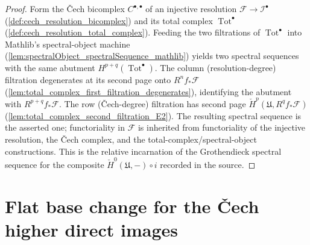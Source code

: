 \begin{proof}
  Form the {\v C}ech bicomplex \(C^{\bullet,\bullet}\) of an injective resolution
  \(\mathcal{F} \to \mathcal{I}^\bullet\) (\cref{def:cech_resolution_bicomplex}) and its
  total complex \(\operatorname{Tot}^\bullet\) (\cref{def:cech_resolution_total_complex}).
  Feeding the two filtrations of \(\operatorname{Tot}^\bullet\) into Mathlib's
  spectral-object machine (\cref{lem:spectralObject_spectralSequence_mathlib}) yields
  two spectral sequences with the same abutment
  \(H^{p+q}(\operatorname{Tot}^\bullet)\). The column (resolution-degree) filtration
  degenerates at its second page onto \(R^n f_*\mathcal{F}\)
  (\cref{lem:total_complex_first_filtration_degenerates}), identifying the abutment with
  \(R^{p+q} f_*\mathcal{F}\). The row ({\v C}ech-degree) filtration has second page
  \(\check{H}^p(\mathfrak{U}, R^q f_*\mathcal{F})\)
  (\cref{lem:total_complex_second_filtration_E2}). The resulting spectral sequence is
  the asserted one; functoriality in \(\mathcal{F}\) is inherited from functoriality of
  the injective resolution, the {\v C}ech complex, and the total-complex/spectral-object
  constructions. This is the relative incarnation of the Grothendieck spectral sequence
  for the composite \(\check{H}^0(\mathfrak{U}, -) \circ i\) recorded in the source.
\end{proof}

\section{Flat base change for the {\v C}ech higher direct images}

